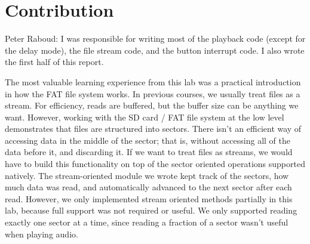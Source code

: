\documentclass[12pt]{article}
\begin{document}
\section{Contribution}
Peter Raboud:
I was responsible for writing most of the playback code (except for the delay mode),
the file stream code, and the button interrupt code.
I also wrote the first half of this report.

The most valuable learning experience from this lab was a practical introduction
in how the FAT file system works.
In previous courses, we usually treat files as a stream.
For efficiency, reads are buffered, but the buffer size can be anything we want.
However, working with the SD card / FAT file system at the low level demonstrates
that files are structured into sectors.
There isn't an efficient way of accessing data in the middle of the sector; that
is, without accessing all of the data before it, and discarding it.
If we want to treat files as streams, we would have to build this functionality
on top of the sector oriented operations supported natively.
The stream-oriented module we wrote kept track of the sectors, how much data was
read, and automatically advanced to the next sector after each read.
However, we only implemented stream oriented methods partially in this lab,
because full support was not required or useful.
We only supported reading exactly one sector at a time, since reading a fraction
of a sector wasn't useful when playing audio.
\end{document}
